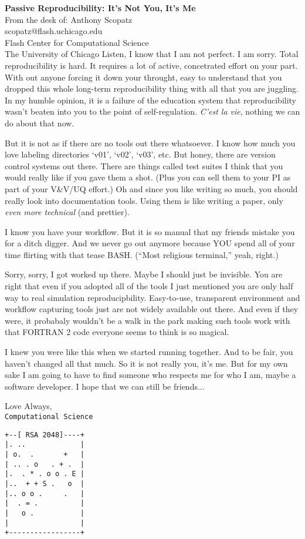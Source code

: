 \documentclass[10pt]{letter}
\begin{document}
\begin{letter}{
{\bf Passive Reproducibility: It's Not You, It's Me}\\
From the desk of: Anthony Scopatz\\
scopatz@flash.uchicago.edu\\
Flash Center for Computational Science\\
The University of Chicago
}
Listen, I know that I am not perfect.  I am sorry.  Total reproducibility is hard.
It requires a lot of active, concetrated effort on your part.  With out anyone 
forcing it down your throught, easy to understand that you dropped this whole 
long-term reproducibility thing with all that you are juggling.  In my humble 
opinion, it is a failure of the education system that reproducibility wasn't 
beaten into you to the point of self-regulation.  \emph{C'est la vie}, nothing we can 
do about that now.

But it is not as if there are no tools out there whatsoever.  I know how much you
love labeling directories `v01', `v02', `v03', etc.  But honey, there are version 
control systems out there.  There are things called test suites I think that you 
would really like if you gave them a shot.  (Plus you can sell them to your PI as 
part of your V\&V/UQ effort.)  Oh and since you like writing so much, you should 
really look into documentation tools.  Using them is like writing a paper, only
\emph{even more technical} (and prettier).

I know you have your workflow.  But it is so manual that my friends mistake you for
a ditch digger.  And we never go out anymore because YOU spend all of your time 
flirting with that tease BASH.  (``Most religious terminal,'' yeah, right.)

Sorry, sorry, I got worked up there.  Maybe I should just be invisible.  You are 
right that even if you adopted all of the tools I just mentioned you are only
half way to real simulation reproducipbility.  Easy-to-use, transparent environment
and workflow capturing tools just are not widely available out there.  And even if
they were, it probabaly wouldn't be a walk in the park making such tools work with
that FORTRAN 2 code everyone seems to think is so magical.   

I knew you were like this when we started running together.  And to be fair, you 
haven't changed all that much.  So it is not really you, it's me. But for my own sake 
I am going to have to find someone who respects me for who I am, maybe 
a software developer.  I hope that we can still be friends...


Love Always,\\
{\tt Computational Science}
\begin{verbatim}
+--[ RSA 2048]----+
|. ..             |
| o.  .       +   |
| .. . o   . + .  |
|.  . * . o o . E |
|..  + + S .   o  |
|.. o o .     .   |
|  . = .          |
|   o .           |
|                 |
+-----------------+
\end{verbatim}


\end{letter}
\end{document}
